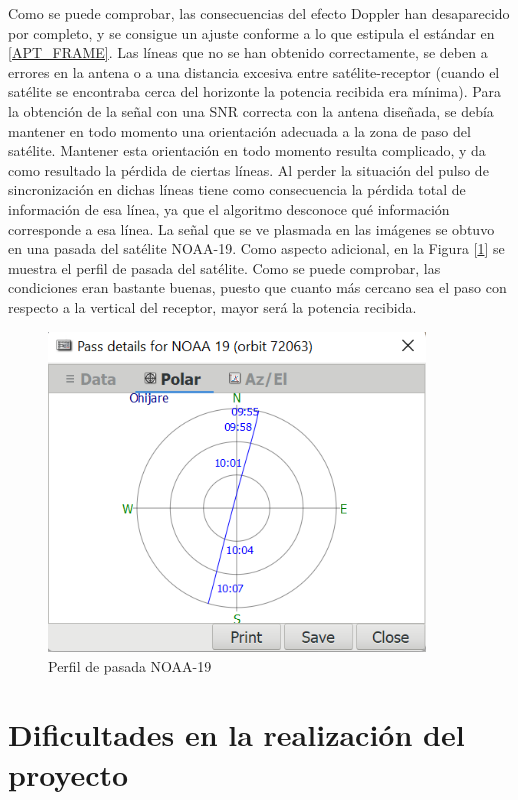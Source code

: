 \documentclass[a4paper,openright,12pt]{article}
\begin{document}
 Como se puede comprobar, las consecuencias del efecto Doppler han desaparecido por completo, y se consigue un ajuste conforme a lo que estipula el estándar en \ref{APT_FRAME}. Las líneas que no se han obtenido correctamente, se deben a errores en la antena o a una distancia excesiva entre satélite-receptor (cuando el satélite se encontraba cerca del horizonte la potencia recibida era mínima). Para la obtención de la señal con una SNR correcta con la antena diseñada, se debía mantener en todo momento una orientación adecuada a la zona de paso del satélite. Mantener esta orientación en todo momento resulta complicado, y da como resultado la pérdida de ciertas líneas. Al perder la situación del pulso de sincronización en   dichas líneas tiene como consecuencia la pérdida total de información de esa línea, ya que el algoritmo desconoce qué información corresponde a esa línea. La señal que se ve plasmada en las imágenes se obtuvo en una pasada del satélite NOAA-19. Como aspecto adicional, en la Figura [\ref{perfil-pasada}] se muestra el perfil de pasada del satélite. Como se puede comprobar, las condiciones eran bastante buenas, puesto que cuanto más cercano sea el paso con respecto a la  vertical del receptor, mayor será la potencia recibida.
 
  \begin{figure}[hbtp]
 \centering
 \includegraphics[width = 10cm]{imagenes/noaa_19 pass 31_01.png}
 \caption{Perfil de pasada NOAA-19}
 \label{perfil-pasada}
 \end{figure}
 
 
 

 

\section{Dificultades en la realización del proyecto}
\end{document}
